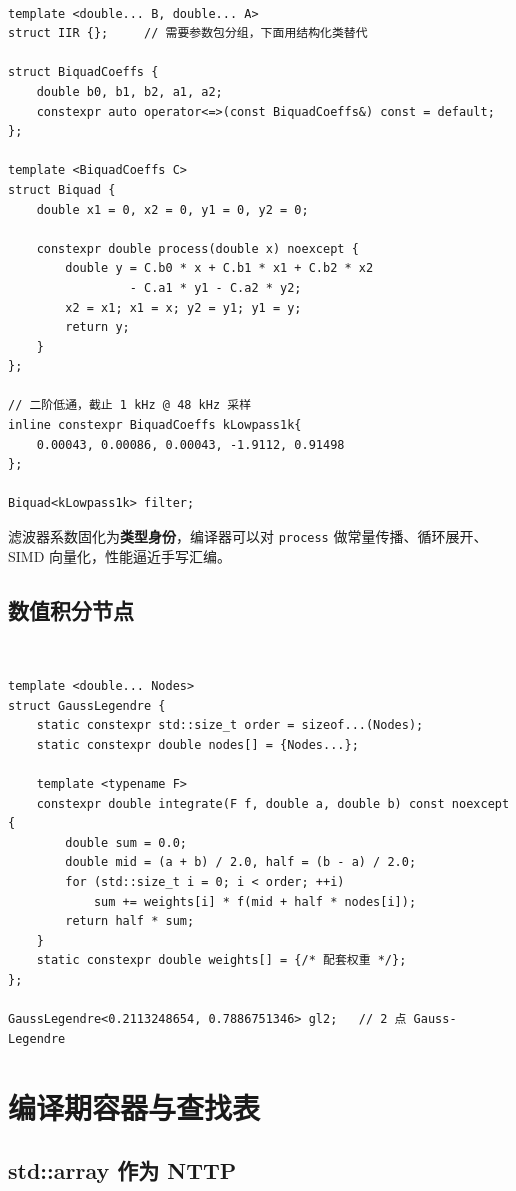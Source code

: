 \documentclass[12pt,a4paper,fontset=fandol]{ctexbook}
\newcommand{\cppxxlabel}[1]{%
  \tcbox[on line,colback=cpp20bg,colframe=cpp20bg,
    boxrule=0pt,arc=1pt,left=2pt,right=2pt,top=1pt,bottom=1pt,
    colupper=white,fontupper=\scriptsize\bfseries]{#1}}
\newcommand{\kw}[1]{\texttt{#1}}
\begin{document}
\cppxxlabel{C++20}\ \begin{lstlisting}
template <double... B, double... A>
struct IIR {};     // 需要参数包分组，下面用结构化类替代

struct BiquadCoeffs {
    double b0, b1, b2, a1, a2;
    constexpr auto operator<=>(const BiquadCoeffs&) const = default;
};

template <BiquadCoeffs C>
struct Biquad {
    double x1 = 0, x2 = 0, y1 = 0, y2 = 0;

    constexpr double process(double x) noexcept {
        double y = C.b0 * x + C.b1 * x1 + C.b2 * x2
                 - C.a1 * y1 - C.a2 * y2;
        x2 = x1; x1 = x; y2 = y1; y1 = y;
        return y;
    }
};

// 二阶低通，截止 1 kHz @ 48 kHz 采样
inline constexpr BiquadCoeffs kLowpass1k{
    0.00043, 0.00086, 0.00043, -1.9112, 0.91498
};

Biquad<kLowpass1k> filter;
\end{lstlisting}

滤波器系数固化为\textbf{类型身份}，编译器可以对 \kw{process} 做常量传播、循环展开、SIMD 向量化，性能逼近手写汇编。

\section{数值积分节点}

\cppxxlabel{C++20}\ \begin{lstlisting}
template <double... Nodes>
struct GaussLegendre {
    static constexpr std::size_t order = sizeof...(Nodes);
    static constexpr double nodes[] = {Nodes...};

    template <typename F>
    constexpr double integrate(F f, double a, double b) const noexcept {
        double sum = 0.0;
        double mid = (a + b) / 2.0, half = (b - a) / 2.0;
        for (std::size_t i = 0; i < order; ++i)
            sum += weights[i] * f(mid + half * nodes[i]);
        return half * sum;
    }
    static constexpr double weights[] = {/* 配套权重 */};
};

GaussLegendre<0.2113248654, 0.7886751346> gl2;   // 2 点 Gauss-Legendre
\end{lstlisting}

\chapter{编译期容器与查找表}

\section{std::array 作为 NTTP}
\end{document}
